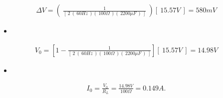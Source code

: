 \begin{ceqn}
\begin{align}
\Delta V = (\ \frac{1}{[\ 2\ (\ 60Hz\ )(\ 100\Omega\ )(\ 2200\mu F\ )\ ]}\ )[\ 15.57 V\ ] = 580 mV
\end{align}
\end{ceqn}

\begin{itemize}
\item {\bfseries\itshape{}} \hfill \break
{\bfseries\itshape{}}
\end{itemize}

\begin{ceqn}
\begin{align}
V_{0} = [ 1 - \frac{1}{[\ 2\ (\ 60Hz\ )(\ 100\Omega\ )(\ 2200\mu F\ )\ ] }][\ 15.57 V\ ] = 14.98 V
\end{align}
\end{ceqn}

\begin{itemize}
\item {\bfseries\itshape{}} \hfill \break
{\bfseries\itshape{}}
\end{itemize}

\begin{ceqn}
\begin{align}
I_{0} = \frac{V_{0}}{R_{L}} = \frac{14.98V}{100\Omega} = 0.149 A.
\end{align}
\end{ceqn}

\pagebreak